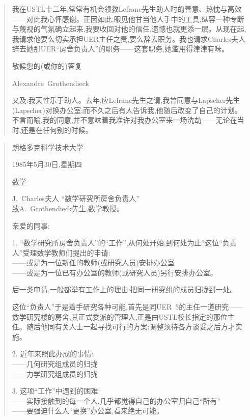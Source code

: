 \begin{quote}
我在USTL十二年,常常有机会领教Lefranc先生助人时的善意、热忱与高效——对此我心怀感谢。正因如此,眼见他甘当他人手中的工具,纵容一种专断与蔑视的气氛确立起来,我要收回对他的信任,遗憾也就更添一层。从现在起,我请求他要么切实承担UER主任之责,要么辞去职务。我也请求Charles夫人辞去她那UER“房舍负责人”的职务——这套职务,她滥用得津津有味。

敬候您的(或你的)答复

\hfill Alexandre~Grothendieck

又及:我天性乐于助人。去年,应Lefranc先生之请,我曾同意与Lapscher先生(Lapscher)对换办公室;而不久之后有人告诉我,他随后改变了自己的计划。不言而喻,我的同意,并不意味着我准许对我办公室来一场洗劫——无论在当时,还是在任何别的时候。
\end{quote}

\begin{quote}
朗格多克科学技术大学

\hfill 1985年5月30日,星期四

\underline{数学}

\pmark{}J.~Charles夫人 “数学研究所房舍负责人”\\
致A.~Grothendieck先生,数学教授。

\begin{center}亲爱的同事:\end{center}

1. “数学研究所房舍负责人”的“工作”,从何处开始,到何处为止?这位“负责人”受理数学教师们提出的申请:\\
——或是为一位新任的教师(或研究人员)安排办公室\\
——或是为一位已有办公室的教师(或研究人员)另行安排办公室。

后一类申请,一般都举有工作上的理由:把同一研究组的成员归拢到一处。

这位“负责人”于是着手研究各种可能,首先是同UER~5的主任一道研究——数学研究楼的房舍,其正式委派的管理人,正是由USTL校长指定的那位主任。随后他同有关人士一起寻找可行的方案;调整须待各方谈妥之后方才实施。

2. 近年来照此办成的事情:\\
——几何研究组成员的归拢\\
——力学研究组成员的归拢

3. 这项“工作”中遇到的困难:\\
——实际接触到的每一个人,几乎都觉得自己的办公室归自己“所有”\\
——要强迫什么人“更换”办公室,看来绝无可能。


\end{quote}
